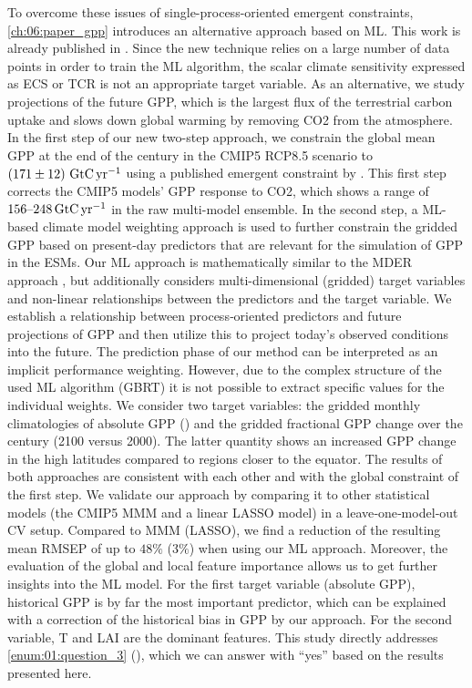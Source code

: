 To overcome these issues of single-process-oriented emergent constraints,
\cref{ch:06:paper_gpp} introduces an alternative approach based on \ac{ML}.
This work is already published in \textcite{Schlund2020}. Since the new
technique relies on a large number of data points in order to train the \ac{ML}
algorithm, the scalar climate sensitivity expressed as \ac{ECS} or \ac{TCR} is
not an appropriate target variable. As an alternative, we study projections of
the future \ac{GPP}, which is the largest flux of the terrestrial carbon uptake
and slows down global warming by removing \ac{CO2} from the atmosphere. In the
first step of our new two-step approach, we constrain the global mean \ac{GPP}
at the end of the  century in the \acs{CMIP}5 \acs{RCP}8.5 scenario to
$\pmrangeunit{171}{12}{\GtCyr{}}$ using a published emergent constraint by
\textcite{Wenzel2016}. This first step corrects the \acs{CMIP}5 models' GPP
response to \ac{CO2}, which shows a range of $\rangeunit{156}{248}{\GtCyr{}}$
in the raw multi-model ensemble. In the second step, a \ac{ML}-based climate
model weighting approach is used to further constrain the gridded \ac{GPP}
based on present-day predictors that are relevant for the simulation of
\ac{GPP} in the \acp{ESM}. Our \ac{ML} approach is mathematically similar to
the \ac{MDER} approach \autocite{Karpechko2013, Senftleben2020, Wenzel2016a},
but additionally considers multi-dimensional (gridded) target variables and
non-linear relationships between the predictors and the target variable. We
establish a relationship between process‐oriented predictors and future
projections of \ac{GPP} and then utilize this to project today's observed
conditions into the future. The prediction phase of our method can be
interpreted as an implicit performance weighting. However, due to the complex
structure of the used \ac{ML} algorithm (\ac{GBRT}) it is not possible to
extract specific values for the individual weights. We consider two target
variables: the gridded monthly climatologies of absolute \ac{GPP}
() and the gridded fractional \ac{GPP} change over the
 century (2100 versus 2000). The latter quantity shows an increased
\acs{GPP} change in the high latitudes compared to regions closer to the
equator. The results of both approaches are consistent with each other and with
the global constraint of the first step. We validate our approach by comparing
it to other statistical models (the \acs{CMIP}5 \ac{MMM} and a linear
\ac{LASSO} model) in a leave‐one‐model‐out \ac{CV} setup. Compared to \ac{MMM}
(\ac{LASSO}), we find a reduction of the resulting mean \ac{RMSEP} of up to $48
\unit{\%}$ ($3 \unit{\%}$) when using our \ac{ML} approach. Moreover, the
evaluation of the global and local feature importance allows us to get further
insights into the \ac{ML} model. For the first target variable (absolute
\ac{GPP}), historical \ac{GPP} is by far the most important predictor, which
can be explained with a correction of the historical bias in \ac{GPP} by our
approach. For the second variable, \ac{T} and \ac{LAI} are the dominant
features. This study directly addresses \cref{enum:01:question_3}
(\KeyScienceQuestionThree{}), which we can answer with \enquote{yes} based on
the results presented here.


